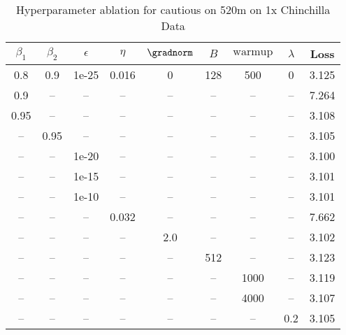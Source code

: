 \begin{table}[h!]
\centering
\caption{Hyperparameter ablation for cautious on 520m on 1x Chinchilla Data}
\label{tab:ablation_cautious_520m_on_1x_chinchilla_data}
\begin{tabular}{ccccccccc}
\toprule
$\beta_1$ & $\beta_2$ & $\epsilon$ & $\eta$ & $\gradnorm$ & $B$ & $\mathrm{warmup}$ & $\lambda$ & Loss \\
\midrule
0.8 & 0.9 & 1e-25 & 0.016 & 0 & 128 & 500 & 0 & 3.125 \\
\midrule
0.9 & -- & -- & -- & -- & -- & -- & -- & 7.264 \\
0.95 & -- & -- & -- & -- & -- & -- & -- & 3.108 \\
-- & 0.95 & -- & -- & -- & -- & -- & -- & 3.105 \\
-- & -- & 1e-20 & -- & -- & -- & -- & -- & 3.100 \\
-- & -- & 1e-15 & -- & -- & -- & -- & -- & 3.101 \\
-- & -- & 1e-10 & -- & -- & -- & -- & -- & 3.101 \\
-- & -- & -- & 0.032 & -- & -- & -- & -- & 7.662 \\
-- & -- & -- & -- & 2.0 & -- & -- & -- & 3.102 \\
-- & -- & -- & -- & -- & 512 & -- & -- & 3.123 \\
-- & -- & -- & -- & -- & -- & 1000 & -- & 3.119 \\
-- & -- & -- & -- & -- & -- & 4000 & -- & 3.107 \\
-- & -- & -- & -- & -- & -- & -- & 0.2 & 3.105 \\
\bottomrule
\end{tabular}
\end{table}

